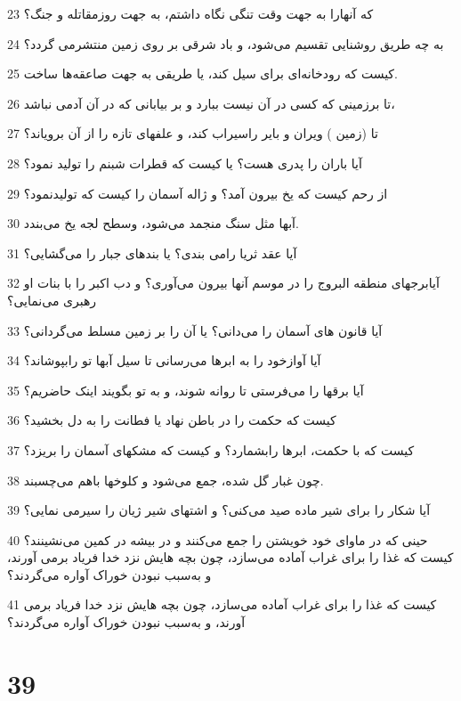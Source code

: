 \par 23 که آنهارا به جهت وقت تنگی نگاه داشتم، به جهت روزمقاتله و جنگ؟
\par 24 به چه طریق روشنایی تقسیم می‌شود، و باد شرقی بر روی زمین منتشرمی گردد؟
\par 25 کیست که رودخانه‌ای برای سیل کند، یا طریقی به جهت صاعقه‌ها ساخت.
\par 26 تا برزمینی که کسی در آن نیست ببارد و بر بیابانی که در آن آدمی نباشد،
\par 27 تا (زمین ) ویران و بایر راسیراب کند، و علفهای تازه را از آن برویاند؟
\par 28 آیا باران را پدری هست؟ یا کیست که قطرات شبنم را تولید نمود؟
\par 29 از رحم کیست که یخ بیرون آمد؟ و ژاله آسمان را کیست که تولیدنمود؟
\par 30 آبها مثل سنگ منجمد می‌شود، وسطح لجه یخ می‌بندد.
\par 31 آیا عقد ثریا رامی بندی؟ یا بندهای جبار را می‌گشایی؟
\par 32 آیابرجهای منطقه البروج را در موسم آنها بیرون می‌آوری؟ و دب اکبر را با بنات او رهبری می‌نمایی؟
\par 33 آیا قانون های آسمان را می‌دانی؟ یا آن را بر زمین مسلط می‌گردانی؟
\par 34 آیا آوازخود را به ابرها می‌رسانی تا سیل آبها تو رابپوشاند؟
\par 35 آیا برقها را می‌فرستی تا روانه شوند، و به تو بگویند اینک حاضریم؟
\par 36 کیست که حکمت را در باطن نهاد یا فطانت را به دل بخشید؟
\par 37 کیست که با حکمت، ابرها رابشمارد؟ و کیست که مشکهای آسمان را بریزد؟
\par 38 چون غبار گل شده، جمع می‌شود و کلوخها باهم می‌چسبند.
\par 39 آیا شکار را برای شیر ماده صید می‌کنی؟ و اشتهای شیر ژیان را سیرمی نمایی؟
\par 40 حینی که در ماوای خود خویشتن را جمع می‌کنند و در بیشه در کمین می‌نشینند؟کیست که غذا را برای غراب آماده می‌سازد، چون بچه هایش نزد خدا فریاد برمی آورند، و به‌سبب نبودن خوراک آواره می‌گردند؟
\par 41 کیست که غذا را برای غراب آماده می‌سازد، چون بچه هایش نزد خدا فریاد برمی آورند، و به‌سبب نبودن خوراک آواره می‌گردند؟
 
\chapter{39}

